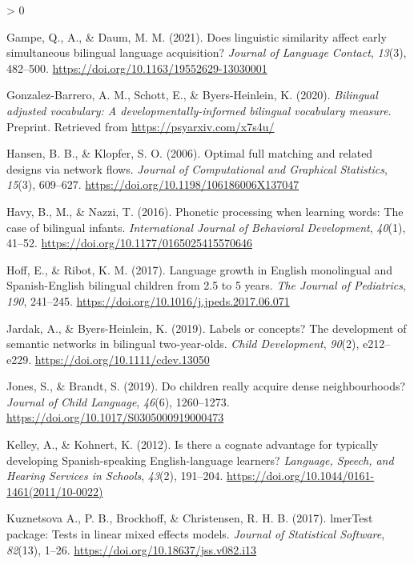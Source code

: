 \documentclass[
  english,
  ,man,floatsintext]{apa6}
\newlength{\cslhangindent}
\newenvironment{CSLReferences}[2] %
 {%
  \setlength{\parindent}{0pt}
  \ifodd #1 \everypar{\setlength{\hangindent}{\cslhangindent}}\ignorespaces\fi
  \ifnum #2 > 0
  \setlength{\parskip}{#2\baselineskip}
  \fi
 }%
 {}
\begin{document}
\begin{CSLReferences}{1}{0}
\leavevmode\hypertarget{ref-Gampe_etal_2021}{}%
Gampe, Q., A., \& Daum, M. M. (2021). Does linguistic similarity affect early simultaneous bilingual language acquisition? \emph{Journal of Language Contact}, \emph{13}(3), 482--500. \url{https://doi.org/10.1163/19552629-13030001}

\leavevmode\hypertarget{ref-Gonzalez-Barrero_2020}{}%
Gonzalez-Barrero, A. M., Schott, E., \& Byers-Heinlein, K. (2020). \emph{Bilingual adjusted vocabulary: A developmentally-informed bilingual vocabulary measure}. Preprint. Retrieved from \url{https://psyarxiv.com/x7s4u/}

\leavevmode\hypertarget{ref-Hanson_Klopfer_2006}{}%
Hansen, B. B., \& Klopfer, S. O. (2006). Optimal full matching and related designs via network flows. \emph{Journal of Computational and Graphical Statistics}, \emph{15}(3), 609--627. \url{https://doi.org/10.1198/106186006X137047}

\leavevmode\hypertarget{ref-Havy_etal_2016}{}%
Havy, B., M., \& Nazzi, T. (2016). Phonetic processing when learning words: The case of bilingual infants. \emph{International Journal of Behavioral Development}, \emph{40}(1), 41--52. \url{https://doi.org/10.1177/0165025415570646}

\leavevmode\hypertarget{ref-Hoff_Ribot_2017}{}%
Hoff, E., \& Ribot, K. M. (2017). Language growth in {E}nglish monolingual and {S}panish-{E}nglish bilingual children from 2.5 to 5 years. \emph{The Journal of Pediatrics}, \emph{190}, 241--245. \url{https://doi.org/10.1016/j.jpeds.2017.06.071}

\leavevmode\hypertarget{ref-Jardak_Byers-Heinlein_2019}{}%
Jardak, A., \& Byers-Heinlein, K. (2019). Labels or concepts? The development of semantic networks in bilingual two-year-olds. \emph{Child Development}, \emph{90}(2), e212--e229. \url{https://doi.org/10.1111/cdev.13050}

\leavevmode\hypertarget{ref-Jones_Brandt_2019}{}%
Jones, S., \& Brandt, S. (2019). Do children really acquire dense neighbourhoods? \emph{Journal of Child Language}, \emph{46}(6), 1260--1273. \url{https://doi.org/10.1017/S0305000919000473}

\leavevmode\hypertarget{ref-Kelley_Kohnert_2012}{}%
Kelley, A., \& Kohnert, K. (2012). Is there a cognate advantage for typically developing {S}panish-speaking {E}nglish-language learners? \emph{Language, Speech, and Hearing Services in Schools}, \emph{43}(2), 191--204. \url{https://doi.org/10.1044/0161-1461(2011/10-0022)}

\leavevmode\hypertarget{ref-Kuznetsova_etal_2017}{}%
Kuznetsova A., P. B., Brockhoff, \& Christensen, R. H. B. (2017). lmerTest package: Tests in linear mixed effects models. \emph{Journal of Statistical Software}, \emph{82}(13), 1--26. \url{https://doi.org/10.18637/jss.v082.i13}


\end{CSLReferences}
\end{document}
